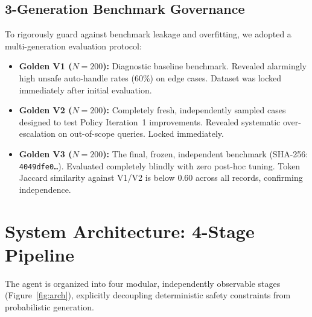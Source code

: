 \documentclass[10pt,twocolumn,a4paper]{article}
\begin{document}
\subsection{3-Generation Benchmark Governance}
To rigorously guard against benchmark leakage and overfitting, we
adopted a multi-generation evaluation protocol:

\begin{itemize}
  \item \textbf{Golden V1 ($N{=}200$):} Diagnostic baseline benchmark.
        Revealed alarmingly high unsafe auto-handle rates (60\%) on
        edge cases. Dataset was locked immediately after initial
        evaluation.

  \item \textbf{Golden V2 ($N{=}200$):} Completely fresh, independently
        sampled cases designed to test Policy Iteration~1 improvements.
        Revealed systematic over-escalation on out-of-scope queries.
        Locked immediately.

  \item \textbf{Golden V3 ($N{=}200$):} The final, frozen, independent
        benchmark (SHA-256: \texttt{4049dfe0\ldots}). Evaluated
        completely blindly with zero post-hoc tuning. Token Jaccard
        similarity against V1/V2 is below 0.60 across all records,
        confirming independence.
\end{itemize}

\section{System Architecture: 4-Stage Pipeline}\label{sec:arch}

The agent is organized into four modular, independently observable
stages (Figure~\ref{fig:arch}), explicitly decoupling deterministic
safety constraints from probabilistic generation.
\end{document}

